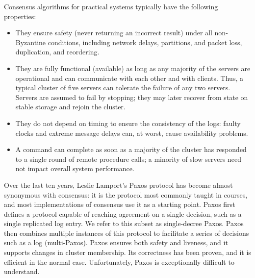 \documentclass[12pt,letterpaper]{article}
\begin{document}
Consensus algorithms for practical systems typically have the following properties:
\begin{itemize}
    \item They ensure safety (never returning an incorrect result)
    under all non-Byzantine conditions, including network delays, partitions, and packet loss, duplication, and reordering.
    \item They are fully functional (available) as long as any majority of the servers are operational and can communicate with each other and with clients. Thus, a typical cluster of five servers can tolerate the failure of any two servers. Servers are assumed to fail by stopping; they may later recover from state on stable storage and rejoin the cluster.
    \item They do not depend on timing to ensure the consistency of the logs: faulty clocks and extreme message delays can, at worst, cause availability problems.
    \item A command can complete as soon as a majority of the cluster has responded to a single round of remote procedure calls; a minority of slow servers need not impact overall system performance.

\end{itemize}

Over the last ten years, Leslie Lamport’s Paxos protocol has become almost synonymous with consensus: it is the protocol most commonly taught in courses, and most implementations of consensus use it as a starting point. Paxos first defines a protocol capable of reaching agreement on a single decision, such as a single replicated log entry. We refer to this subset as single-decree Paxos. Paxos then combines multiple instances of this protocol to facilitate a series of decisions such as a log (multi-Paxos). Paxos ensures both safety and liveness, and it supports changes in cluster membership. Its correctness has been proven, and it is efficient in the normal case. Unfortunately, Paxos is exceptionally difficult to understand.
\end{document}

